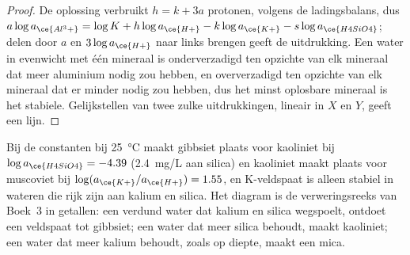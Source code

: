 \begin{proof}
De oplossing verbruikt $h = k + 3a$ protonen, volgens de ladingsbalans, dus $a\log
a_{\ce{Al^3+}} = \log K + h\log a_{\ce{H+}} - k\log a_{\ce{K+}} - s\log
a_{\ce{H4SiO4}}$; delen door $a$ en $3\log a_{\ce{H+}}$ naar links brengen
geeft de uitdrukking. Een water in evenwicht met één mineraal is
onderverzadigd ten opzichte van elk mineraal dat meer aluminium nodig zou hebben, en
oververzadigd ten opzichte van elk mineraal dat er minder nodig zou hebben, dus het minst
oplosbare mineraal is het stabiele. Gelijkstellen van twee zulke uitdrukkingen, lineair in $X$ en $Y$, geeft een lijn.
\end{proof}

Bij de constanten bij \qty{25}{\celsius} maakt gibbsiet plaats voor kaoliniet bij
$\log a_{\ce{H4SiO4}} = -4.39$ (\qty{2.4}{mg/L} aan silica) en kaoliniet maakt plaats voor
muscoviet bij $\log(a_{\ce{K+}}/a_{\ce{H+}}) = 1.55$, en K-veldspaat is
alleen stabiel in wateren die rijk zijn aan kalium en silica. Het diagram is de verweringsreeks van
Boek~3 in getallen: een verdund water dat kalium en silica wegspoelt, ontdoet een
veldspaat tot gibbsiet; een water dat meer silica behoudt, maakt kaoliniet; een water
dat meer kalium behoudt, zoals op diepte,
maakt een mica.

